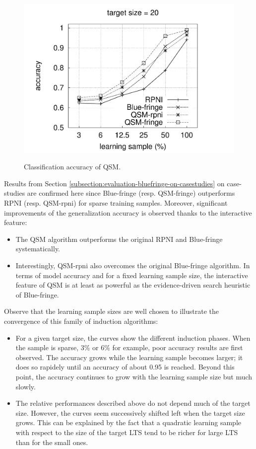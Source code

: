 \begin{figure}[t]
{  \includegraphics[trim=30mm 0mm 35mm 0mm, clip, page=4]{src/5-evaluation/images/accuracy}
}
\caption{Classification accuracy of QSM\label{image:evaluation-qsm-accuracy}.}
\end{figure}

Results from Section \ref{subsection:evaluation-bluefringe-on-casestudies} on case-studies are confirmed here since Blue-fringe (resp. QSM-fringe) outperforms RPNI (resp. QSM-rpni) for sparse training samples. Moreover, significant improvements of the generalization accuracy is observed thanks to the interactive feature:
\begin{itemize}
\item The QSM algorithm outperforms the original RPNI and Blue-fringe systematically.
\item Interestingly, QSM-rpni also overcomes the original Blue-fringe algorithm. In terms of model accuracy and for a fixed learning sample size, the interactive feature of QSM is at least as powerful as the evidence-driven search heuristic of Blue-fringe.
\end{itemize}

Observe that the learning sample sizes are well chosen to illustrate the convergence of this family of induction algorithms:
\begin{itemize}
\item For a given target size, the curves show the different induction phases. When the sample is sparse, 3\% or 6\% for example, poor accuracy results are first observed. The accuracy grows while the learning sample becomes larger; it does so rapidely until an accuracy of about 0.95 is reached. Beyond this point, the accuracy continues to grow with the learning sample size but much slowly. 
\item The relative performances described above do not depend much of the target size. However, the curves seem successively shifted left when the target size grows. This can be explained by the fact that a quadratic learning sample with respect to the size of the target LTS tend to be richer for large LTS than for the small ones. 
\end{itemize}

